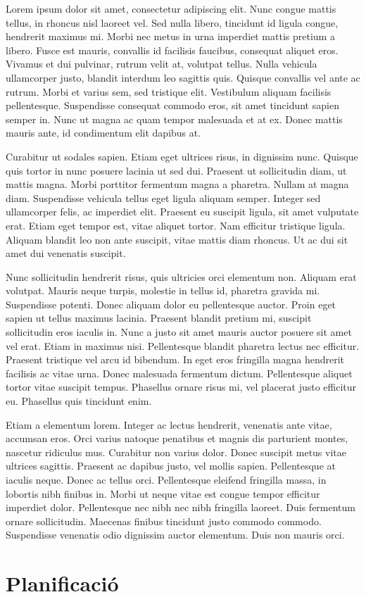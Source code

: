 \documentclass[a4paper,12pt,twoside]{ThesisStyle}
\begin{document}
\begin{appendices}
Lorem ipsum dolor sit amet, consectetur adipiscing elit. Nunc congue mattis tellus, in rhoncus nisl laoreet vel. Sed nulla libero, tincidunt id ligula congue, hendrerit maximus mi. Morbi nec metus in urna imperdiet mattis pretium a libero. Fusce est mauris, convallis id facilisis faucibus, consequat aliquet eros. Vivamus et dui pulvinar, rutrum velit at, volutpat tellus. Nulla vehicula ullamcorper justo, blandit interdum leo sagittis quis. Quisque convallis vel ante ac rutrum. Morbi et varius sem, sed tristique elit. Vestibulum aliquam facilisis pellentesque. Suspendisse consequat commodo eros, sit amet tincidunt sapien semper in. Nunc ut magna ac quam tempor malesuada et at ex. Donec mattis mauris ante, id condimentum elit dapibus at.

Curabitur ut sodales sapien. Etiam eget ultrices risus, in dignissim nunc. Quisque quis tortor in nunc posuere lacinia ut sed dui. Praesent ut sollicitudin diam, ut mattis magna. Morbi porttitor fermentum magna a pharetra. Nullam at magna diam. Suspendisse vehicula tellus eget ligula aliquam semper. Integer sed ullamcorper felis, ac imperdiet elit. Praesent eu suscipit ligula, sit amet vulputate erat. Etiam eget tempor est, vitae aliquet tortor. Nam efficitur tristique ligula. Aliquam blandit leo non ante suscipit, vitae mattis diam rhoncus. Ut ac dui sit amet dui venenatis suscipit.

Nunc sollicitudin hendrerit risus, quis ultricies orci elementum non. Aliquam erat volutpat. Mauris neque turpis, molestie in tellus id, pharetra gravida mi. Suspendisse potenti. Donec aliquam dolor eu pellentesque auctor. Proin eget sapien ut tellus maximus lacinia. Praesent blandit pretium mi, suscipit sollicitudin eros iaculis in. Nunc a justo sit amet mauris auctor posuere sit amet vel erat. Etiam in maximus nisi. Pellentesque blandit pharetra lectus nec efficitur. Praesent tristique vel arcu id bibendum. In eget eros fringilla magna hendrerit facilisis ac vitae urna. Donec malesuada fermentum dictum. Pellentesque aliquet tortor vitae suscipit tempus. Phasellus ornare risus mi, vel placerat justo efficitur eu. Phasellus quis tincidunt enim.

Etiam a elementum lorem. Integer ac lectus hendrerit, venenatis ante vitae, accumsan eros. Orci varius natoque penatibus et magnis dis parturient montes, nascetur ridiculus mus. Curabitur non varius dolor. Donec suscipit metus vitae ultrices sagittis. Praesent ac dapibus justo, vel mollis sapien. Pellentesque at iaculis neque. Donec ac tellus orci. Pellentesque eleifend fringilla massa, in lobortis nibh finibus in. Morbi ut neque vitae est congue tempor efficitur imperdiet dolor. Pellentesque nec nibh nec nibh fringilla laoreet. Duis fermentum ornare sollicitudin. Maecenas finibus tincidunt justo commodo commodo. Suspendisse venenatis odio dignissim auctor elementum. Duis non mauris orci.

\chapter{Planificació}


\end{appendices}

\end{document}
